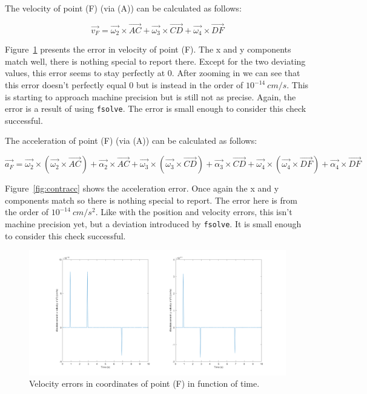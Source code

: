 \documentclass[a4paper]{article}
\begin{document}
The velocity of point (F) (via (A)) can be calculated as follows:

\begin{equation}
	\vec{v_F} = \vec{\omega_2}\times\vec{AC}+ \vec{\omega_3}\times\vec{CD}+ \vec{\omega_4}\times\vec{DF}
\end{equation}

Figure~\ref{fig:contrvel} presents the error in velocity of point (F). The x and y components match well, there is nothing special to report there. Except for the two deviating values, this error seems to stay perfectly at 0. After zooming in we can see that this error doesn’t perfectly equal 0 but is instead in the order of \(10^{-14}~\si{cm/s}\). This is starting to approach machine precision but is still not as precise. Again, the error is a result of using \texttt{fsolve}. The error is small enough to consider this check successful.

The acceleration of point (F) (via (A)) can be calculated as follows:

\begin{equation}
	\vec{a_F} = \vec{\omega_2}\times(\vec{\omega_2}\times\vec{AC}) + \vec{\alpha_2}\times\vec{AC} + \vec{\omega_3}\times(\vec{\omega_3}\times\vec{CD}) + \vec{\alpha_3}\times\vec{CD} + \vec{\omega_4}\times(\vec{\omega_4}\times\vec{DF}) + \vec{\alpha_4}\times\vec{DF}
\end{equation}

Figure~\ref{fig:contracc} shows the acceleration error. Once again the x and y components match so there is nothing special to report. The error here is from the order of \(10^{-14}~\si{cm/s^2}\). Like with the position and velocity errors, this isn’t machine precision yet, but a deviation introduced by \texttt{fsolve}. It is small enough to consider this check successful.

\begin{figure}
	\centering
	
	\includegraphics[width = \textwidth]{contrvel.png}
	
	\caption{Velocity errors in coordinates of point (F) in function of time.}
	\label{fig:contrvel}
	
\end{figure}
\end{document}
